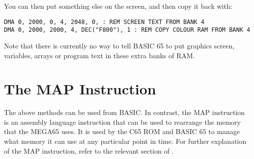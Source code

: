 You can then put something else on the screen, and then copy it back with:

\begin{tcolorbox}[colback=black,coltext=white]
\verbatimfont{\codefont}
\begin{verbatim}
DMA 0, 2000, 0, 4, 2048, 0, : REM SCREEN TEXT FROM BANK 4
DMA 0, 2000, 2000, 4, DEC("F800"), 1 : REM COPY COLOUR RAM FROM BANK 4
\end{verbatim}
\end{tcolorbox}

Note that there is currently no way to tell BASIC 65 to put graphics screen, variables,
arrays or program text in these extra banks of RAM.

\section{The MAP Instruction}

The above methods can be used from BASIC. In contrast, the MAP instruction is an assembly
language instruction that can be used to rearrange the memory that the MEGA65 uses.
It is used by the C65 ROM and BASIC 65 to manage what memory it can use at any particular
point in time.  For further explanation of the MAP instruction, refer to the relevant section of .



